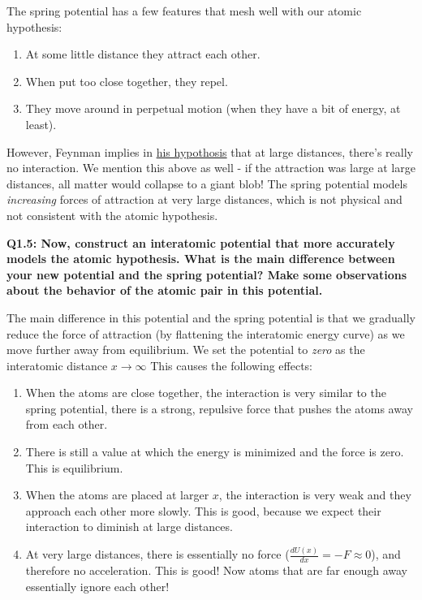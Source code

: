 \documentclass{book}
\providecommand{\tightlist}{%
  \setlength{\itemsep}{0pt}\setlength{\parskip}{0pt}}
\begin{document}
The spring potential has a few features that mesh well with our atomic
hypothesis:

\begin{enumerate}
\def\labelenumi{\arabic{enumi}.}
\tightlist
\item
  At some little distance they attract each other.
\item
  When put too close together, they repel.
\item
  They move around in perpetual motion (when they have a bit of energy, at
  least).
\end{enumerate}

However, Feynman implies in \protect\hyperlink{the-atomic-hypothesis}{his
hypothosis} that at large distances, there's really no interaction. We mention
this above as well - if the attraction was large at large distances, all
matter would collapse to a giant blob! The spring potential models
\emph{increasing} forces of attraction at very large distances, which is not
physical and not consistent with the atomic hypothesis.

\textbf{Q1.5: Now, construct an interatomic potential that more accurately
models the atomic hypothesis. What is the main difference between your new
potential and the spring potential? Make some observations about the behavior
of the atomic pair in this potential.}

The main difference in this potential and the spring potential is that we
gradually reduce the force of attraction (by flattening the interatomic energy
curve) as we move further away from equilibrium. We set the potential to
\emph{zero} as the interatomic distance \(x \rightarrow \infty\) This causes
the following effects:

\begin{enumerate}
\def\labelenumi{\arabic{enumi}.}
\tightlist
\item
  When the atoms are close together, the interaction is very similar to the
  spring potential, there is a strong, repulsive force that pushes the atoms
  away from each other.
\item
  There is still a value at which the energy is minimized and the force is
  zero. This is equilibrium.
\item
  When the atoms are placed at larger \(x\), the interaction is very weak and
  they approach each other more slowly. This is good, because we expect their
  interaction to diminish at large distances.
\item
  At very large distances, there is essentially no force
  (\(\frac{dU(x)}{dx} = -F \approx 0\)), and therefore no acceleration. This
  is good! Now atoms that are far enough away essentially ignore each other!
\end{enumerate}
\end{document}
